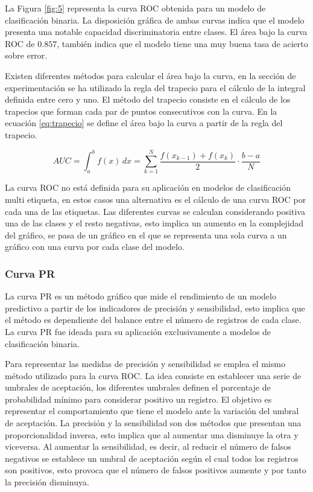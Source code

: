 \bigbreak

La Figura \ref{fig:5} representa la curva ROC obtenida para un modelo de clasificación binaria. La disposición gráfica de ambas curvas indica que el modelo presenta una notable capacidad discriminatoria entre clases. El área bajo la curva ROC de $0.857$, también indica que el modelo tiene una muy buena tasa de acierto sobre error.

\bigbreak

Existen diferentes métodos para calcular el área bajo la curva, en la sección de experimentación se ha utilizado la regla del trapecio para el cálculo de la integral definida entre cero y uno. El método del trapecio consiste en el cálculo de los trapecios que forman cada par de puntos consecutivos con la curva. En la ecuación \ref{eq:trapecio} se define el área bajo la curva a partir de la regla del trapecio.

\bigbreak

\begin{equation}
    AUC = \int_{a}^{b} f(x) \,dx = \sum_{k=1}^{N} \frac{f(x_{k-1})+f(x_{k})}{2} \cdot \frac{b-a}{N}
    \label{eq:trapecio}
\end{equation}

\bigbreak

La curva ROC no está definida para su aplicación en modelos de clasificación multi etiqueta, en estos casos una alternativa es el cálculo de una curva ROC por cada una de las etiquetas. Las diferentes curvas se calculan considerando positiva una de las clases y el resto negativas, esto implica un aumento en la complejidad del gráfico, se pasa de un gráfico en el que se representa una sola curva a un gráfico con una curva por cada clase del modelo.

\clearpage

\subsubsection{Curva PR}

La curva PR es un método gráfico que mide el rendimiento de un modelo predictivo a partir de los indicadores de precisión y sensibilidad, esto implica que el método es dependiente del balance entre el número de registros de cada clase. La curva PR fue ideada para su aplicación exclusivamente a modelos de clasificación binaria.

\bigbreak

Para representar las medidas de precisión y sensibilidad se emplea el mismo método utilizado para la curva ROC. La idea consiste en establecer una serie de umbrales de aceptación, los diferentes umbrales definen el porcentaje de probabilidad mínimo para considerar positivo un registro. El objetivo es representar el comportamiento que tiene el modelo ante la variación del umbral de aceptación. La precisión y la sensibilidad son dos métodos que presentan una proporcionalidad inversa, esto implica que al aumentar una disminuye la otra y viceversa. Al aumentar la sensibilidad, es decir, al reducir el número de falsos negativos se establece un umbral de aceptación según el cual todos los registros son positivos, esto provoca que el número de falsos positivos aumente y por tanto la precisión disminuya.

